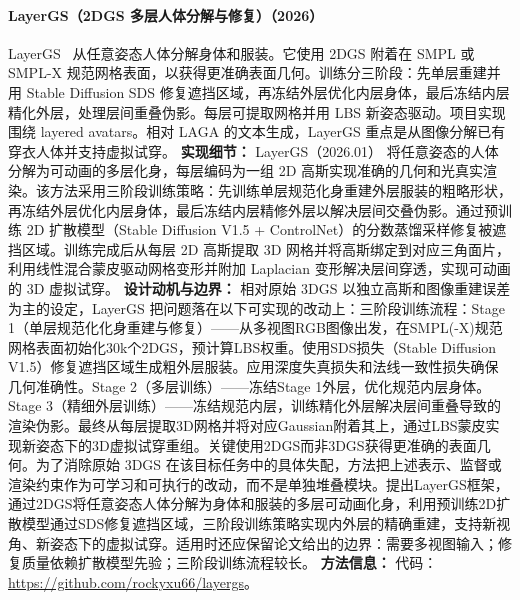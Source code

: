 \paragraph{LayerGS（2DGS 多层人体分解与修复）（2026）}
LayerGS~\cite{2601_05853} 从任意姿态人体分解身体和服装。它使用 2DGS 附着在 SMPL 或 SMPL-X 规范网格表面，以获得更准确表面几何。训练分三阶段：先单层重建并用 Stable Diffusion SDS 修复遮挡区域，再冻结外层优化内层身体，最后冻结内层精化外层，处理层间重叠伪影。每层可提取网格并用 LBS 新姿态驱动。项目实现围绕 layered avatars。相对 LAGA 的文本生成，LayerGS 重点是从图像分解已有穿衣人体并支持虚拟试穿。
\textbf{实现细节：} LayerGS（2026.01） 将任意姿态的人体分解为可动画的多层化身，每层编码为一组 2D 高斯实现准确的几何和光真实渲染。该方法采用三阶段训练策略：先训练单层规范化身重建外层服装的粗略形状，再冻结外层优化内层身体，最后冻结内层精修外层以解决层间交叠伪影。通过预训练 2D 扩散模型（Stable Diffusion V1.5 + ControlNet）的分数蒸馏采样修复被遮挡区域。训练完成后从每层 2D 高斯提取 3D 网格并将高斯绑定到对应三角面片，利用线性混合蒙皮驱动网格变形并附加 Laplacian 变形解决层间穿透，实现可动画的 3D 虚拟试穿。
\textbf{设计动机与边界：} 相对原始 3DGS 以独立高斯和图像重建误差为主的设定，LayerGS 把问题落在以下可实现的改动上：三阶段训练流程：Stage 1（单层规范化化身重建与修复）——从多视图RGB图像出发，在SMPL(-X)规范网格表面初始化30k个2DGS，预计算LBS权重。使用SDS损失（Stable Diffusion V1.5）修复遮挡区域生成粗外层服装。应用深度失真损失和法线一致性损失确保几何准确性。Stage 2（多层训练）——冻结Stage 1外层，优化规范内层身体。Stage 3（精细外层训练）——冻结规范内层，训练精化外层解决层间重叠导致的渲染伪影。最终从每层提取3D网格并将对应Gaussian附着其上，通过LBS蒙皮实现新姿态下的3D虚拟试穿重组。关键使用2DGS而非3DGS获得更准确的表面几何。为了消除原始 3DGS 在该目标任务中的具体失配，方法把上述表示、监督或渲染约束作为可学习和可执行的改动，而不是单独堆叠模块。提出LayerGS框架，通过2DGS将任意姿态人体分解为身体和服装的多层可动画化身，利用预训练2D扩散模型通过SDS修复遮挡区域，三阶段训练策略实现内外层的精确重建，支持新视角、新姿态下的虚拟试穿。适用时还应保留论文给出的边界：需要多视图输入；修复质量依赖扩散模型先验；三阶段训练流程较长。
\textbf{方法信息：} 代码：\url{https://github.com/rockyxu66/layergs}。



